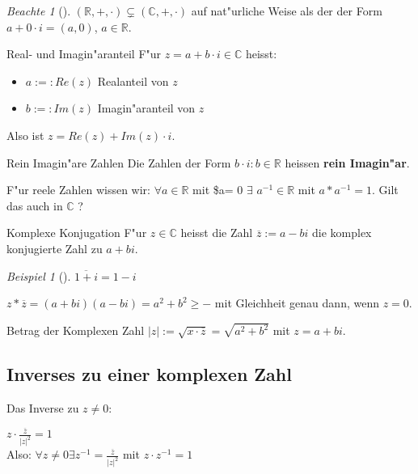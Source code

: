\documentclass[11pt]{article}
\theoremstyle{remark}
\newtheorem{exa}{Beispiel}[section]
\newtheorem*{notte}{Beachte}
\theoremstyle{definition}
\theoremstyle{remark}
\begin{document}
\begin{notte}[] \label{}
\((\mathbb{R},+,\cdot)\subsetneq (\mathbb{C},+,\cdot)\) auf nat"urliche Weise als
der der Form \(a+0\cdot i = (a,0)\), \(a\in \mathbb{R}\).
\end{notte}

\begin{definition}{Real- und Imagin"aranteil}{}
F"ur \(z=a+b\cdot i\in \mathbb{C}\) heisst:
\begin{itemize}
\item \(a:=:Re(z)\) Realanteil von \(z\)
\item \(b:=:Im(z)\) Imagin"aranteil von \(z\)
\end{itemize}

Also ist \(z=Re(z)+ Im(z)\cdot i\).
\end{definition}

\begin{definition}{Rein Imagin"are Zahlen}{}
Die Zahlen der Form \(b\cdot i : b\in \mathbb{R}\) heissen \textbf{rein Imagin"ar}.
\end{definition}

F"ur reele Zahlen wissen wir: \(\forall a\in \mathbb{R}\) mit \$a\textlnot{}= 0 \(\exists\)
\(a^{-1} \in \mathbb{R}\) mit \(a*a^{-1}=1\). Gilt das auch in \(\mathbb{C}\) ?

\begin{definition}{Komplexe Konjugation}{}
F"ur \(z\in \mathbb{C}\) heisst die Zahl \(\overline{z}:=a-bi\) die komplex
konjugierte Zahl zu \(a+bi\).
\end{definition}

\begin{exa}[] \label{}
\(\overline{1+i}=1-i\)
\end{exa}

\begin{relation}
\(z*\overline{z}=(a+bi)(a-bi)=a^2+b^2\geq -\) mit Gleichheit genau dann, wenn \(z=0\).
\end{relation}

\begin{definition}{Betrag der Komplexen Zahl}{}
\(|z|:=\sqrt{x\cdot \overline{z}}=\sqrt{a^2+b^2}\) mit \(z=a+bi\).
\end{definition}

\subsection{Inverses zu einer komplexen Zahl}
\label{sec:org0018acd}
Das Inverse zu \(z\not= 0\):
\begin{relation}
\(z\cdot \frac{\overline{z}}{|z|^2}=1\) \\
Also: \(\forall z\not= 0 \exists z^{-1} = \frac{\overline{z}}{|z|^2}\) mit \(z \cdot z^{-1}=1\)
\end{relation}
\end{document}
